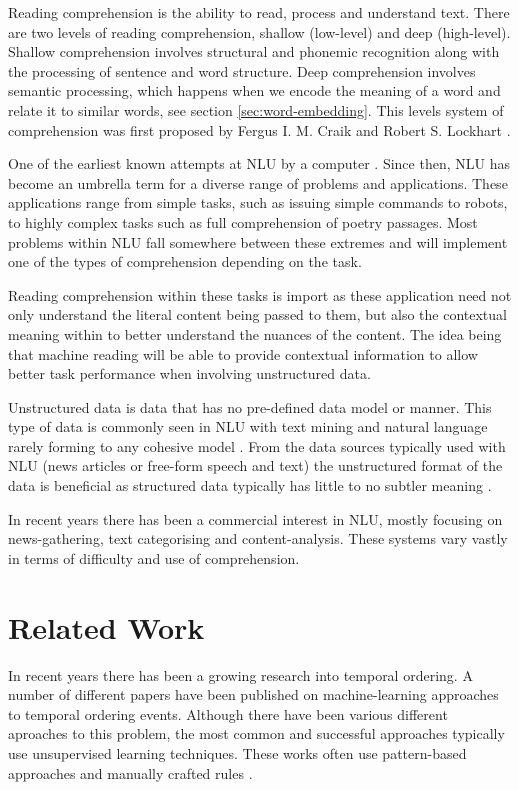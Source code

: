\documentclass[bsc,frontabs,twoside,singlespacing,parskip,deptreport]{infthesis}     %
\begin{document}
Reading comprehension is the ability to read, process and understand text.  
There are two levels of reading comprehension, shallow (low-level) and deep (high-level).
Shallow comprehension involves structural and phonemic recognition along with the processing of sentence and  word
structure.
Deep comprehension involves semantic processing, which happens when we encode the meaning of a word and relate it
to similar words, see section \ref{sec:word-embedding}.
This levels system of comprehension was first proposed by  Fergus I. M. Craik and Robert S. Lockhart \cite{wagner2009beyond}.

One of the earliest known attempts at NLU by a computer \cite{russell1995modern}. Since then, NLU has become an
umbrella term for a diverse range of problems and applications. These applications range from simple tasks, such as
issuing simple commands to robots, to highly complex tasks such as full comprehension of poetry passages.
Most problems within NLU fall somewhere between these extremes and will implement one of the types of comprehension
depending on the task.

Reading comprehension within these tasks is import as these application need not only understand the literal content
being passed to them, but also the contextual meaning within to better understand the nuances of the content.
The idea being that machine reading will be able to provide contextual information to allow better task performance when
involving unstructured data.

Unstructured data is data that has no pre-defined data model or manner. This type of data is
commonly seen in NLU with text mining and natural language rarely forming to any cohesive model \cite{feldman2007text}.
From the data sources typically used with NLU (news articles or free-form speech and text) the unstructured format of
the data is beneficial as structured data typically has little to no subtler meaning \cite{}.

In recent years there has been a commercial interest in NLU, mostly focusing on news-gathering, text categorising and
content-analysis. These systems vary vastly in terms of difficulty and use of comprehension. 


\section{Related Work}
In recent years there has been a growing research into temporal ordering.
A number of different papers have been published on machine-learning approaches to temporal ordering events.
Although there have been various different aproaches to this problem, the most common and successful approaches typically
use unsupervised learning techniques. These works often use pattern-based approaches and manually crafted rules \cite{chklovski2004mining}.  
\end{document}
